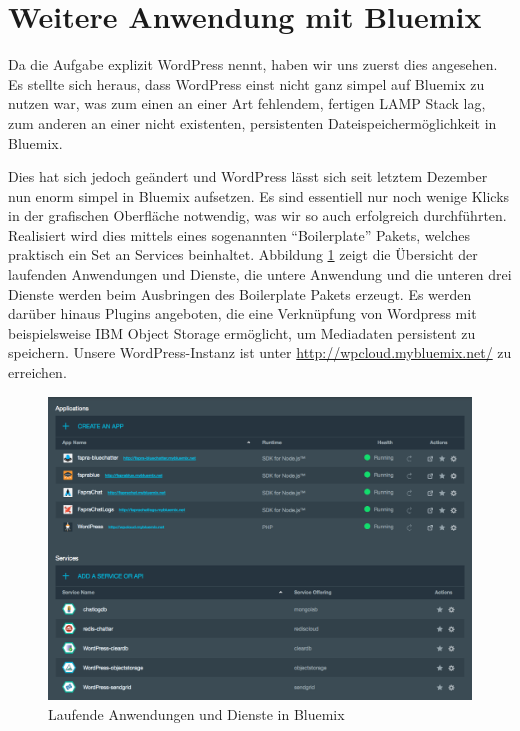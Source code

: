 \section{Weitere Anwendung mit Bluemix}

Da die Aufgabe explizit WordPress nennt, haben wir uns zuerst dies angesehen.
Es stellte sich heraus, dass WordPress einst nicht ganz simpel auf Bluemix zu nutzen war, was zum einen an einer Art fehlendem, fertigen LAMP Stack lag, zum anderen an einer nicht existenten, persistenten Dateispeichermöglichkeit in Bluemix.

Dies hat sich jedoch geändert und WordPress lässt sich seit letztem Dezember nun enorm simpel in Bluemix aufsetzen.
Es sind essentiell nur noch wenige Klicks in der grafischen Oberfläche notwendig, was wir so auch erfolgreich durchführten.
Realisiert wird dies mittels eines sogenannten \enquote{Boilerplate} Pakets, welches praktisch ein Set an Services beinhaltet. Abbildung \ref{fig:wpbluemix} zeigt die Übersicht der laufenden Anwendungen und Dienste, die untere Anwendung und die unteren drei Dienste werden beim Ausbringen des Boilerplate Pakets erzeugt.
Es werden darüber hinaus Plugins angeboten, die eine Verknüpfung von Wordpress mit beispielsweise IBM Object Storage ermöglicht, um Mediadaten persistent zu speichern. Unsere WordPress-Instanz ist unter \url{http://wpcloud.mybluemix.net/} zu erreichen.

\begin{figure}
\includegraphics[width=\linewidth]{WordPress.png}
\caption{Laufende Anwendungen und Dienste in Bluemix}
\label{fig:wpbluemix}
\end{figure}

